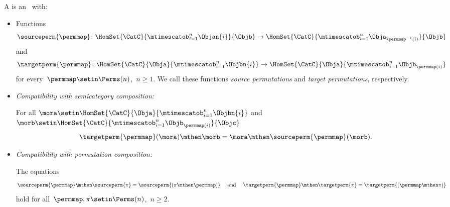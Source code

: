 \begin{ctdefinition}
    \label{def:symmetric-stacking-category}
    A  is an  ~\CatC with:

    \constit

    \begin{itemize}
        \item Functions
              \begin{equation}
                  \sourceperm{\permmap} \colon \HomSet{\CatC}{\mtimescatob_{i=1}^n \Objan{i}}{\Objb} \to \HomSet{\CatC}{\mtimescatob_{i=1}^n \Obja_{\permmap^{-1}(i)}}{\Objb}
              \end{equation}
              and
              \begin{equation}
                  \targetperm{\permmap} \colon \HomSet{\CatC}{\Obja}{\mtimescatob_{i=1}^n \Objbn{i}} \to \HomSet{\CatC}{\Obja}{\mtimescatob_{i=1}^n \Objb_{\permmap(i)}}
              \end{equation}
              for every~$\permmap \setin \Perms(n)$,~$n \geq 1$.
              We call these functions \emph{source permutations} and \emph{target permutations}, respectively.
    \end{itemize}

    \condit

    \begin{itemize}

        \item \emph{Compatibility with semicategory composition:}

              For all $\mora \setin \HomSet{\CatC}{\Obja}{\mtimescatob_{i=1}^n \Objbn{i}}$ and $\morb \setin \HomSet{\CatC}{\mtimescatob_{i=1}^n \Objb_{\permmap(i)}}{\Objc}$
              \begin{equation}
                  \label{eq:perm-compatibility-with-composition}
                  \targetperm{\permmap} (\mora) \mthen \morb = \mora \mthen \sourceperm{\permmap}(\morb).
              \end{equation}

        \item \emph{Compatibility with permutation composition:}

              The equations
              \begin{equation}
                  \label{eq:perm-compatibility-with-perm-comp}
                  \sourceperm{\permmap} \mthen \sourceperm{\pi} = \sourceperm{(\pi\mthen\permmap)}
                  \quad \text{ and } \quad
                  \targetperm{\permmap} \mthen \targetperm{\pi} = \targetperm{(\permmap \mthen \pi)}
              \end{equation}
              hold for all~$\permmap, \pi \setin \Perms(n)$,~$n \geq 2$.


\end{itemize}
\end{ctdefinition}
